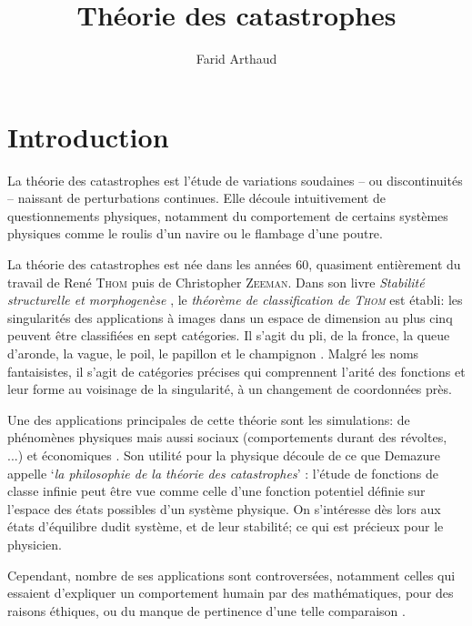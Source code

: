 \documentclass{article}
\theoremstyle{definition}
\begin{document}
%

\setcounter{page}{1}

\title{Théorie des catastrophes}
\author{Farid Arthaud}

\maketitle
\tableofcontents

\section{Introduction}

La théorie des catastrophes est l'étude de variations soudaines -- ou discontinuités -- naissant de perturbations continues. Elle découle intuitivement de questionnements physiques, notamment du comportement de certains systèmes physiques comme le roulis d'un navire \cite{poston} ou le flambage d'une poutre.

La théorie des catastrophes est née dans les années 60, quasiment entièrement du travail de René \textsc{Thom} puis de Christopher \textsc{Zeeman}.
Dans son livre \textit{Stabilité structurelle et morphogenèse} \cite{thom}, le \textit{théorème de classification de \textsc{Thom}} est établi: les singularités des applications à images dans un espace de dimension au plus cinq peuvent être classifiées en sept catégories.
Il s'agit du pli, de la fronce, la queue d'aronde, la vague, le poil, le papillon et le champignon \cite{wikipedia}.
Malgré les noms fantaisistes, il s'agit de catégories précises qui comprennent l'arité des fonctions et leur forme au voisinage de la singularité, à un changement de coordonnées près.

Une des applications principales de cette théorie sont les simulations: de phénomènes physiques mais aussi sociaux (comportements durant des révoltes, ...) et économiques \cite{poston} \cite{bbcvid}.
Son utilité pour la physique découle de ce que Demazure appelle `\textit{la philosophie de la théorie des catastrophes}' \cite{demazure}: l'étude de fonctions de classe infinie peut être vue comme celle d'une fonction potentiel définie sur l'espace des états possibles d'un système physique.
On s'intéresse dès lors aux états d'équilibre dudit système, et de leur stabilité; ce qui est précieux pour le physicien.

Cependant, nombre de ses applications sont controversées, notamment celles qui essaient d'expliquer un comportement humain par des mathématiques, pour des raisons éthiques, ou du manque de pertinence d'une telle comparaison \cite{bbcvid} \cite{wikipedia}.
\end{document}
